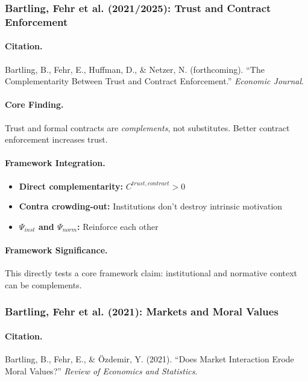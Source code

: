 \documentclass[12pt,a4paper]{article}
\begin{document}
\subsubsection{Bartling, Fehr et al. (2021/2025): Trust and Contract Enforcement}

\paragraph{Citation.}
Bartling, B., Fehr, E., Huffman, D., \& Netzer, N. (forthcoming).
``The Complementarity Between Trust and Contract Enforcement.''
\emph{Economic Journal}.

\paragraph{Core Finding.}
Trust and formal contracts are \emph{complements}, not substitutes.
Better contract enforcement increases trust.

\paragraph{Framework Integration.}
\begin{itemize}
  \item \textbf{Direct complementarity:} $C^{trust, contract} > 0$
  \item \textbf{Contra crowding-out:} Institutions don't destroy intrinsic motivation
  \item \textbf{$\Psi_{inst}$ and $\Psi_{norm}$:} Reinforce each other
\end{itemize}

\paragraph{Framework Significance.}
This directly tests a core framework claim: institutional and normative
context can be complements.

\subsubsection{Bartling, Fehr et al. (2021): Markets and Moral Values}

\paragraph{Citation.}
Bartling, B., Fehr, E., \& \"Ozdemir, Y. (2021).
``Does Market Interaction Erode Moral Values?''
\emph{Review of Economics and Statistics}.
\end{document}
